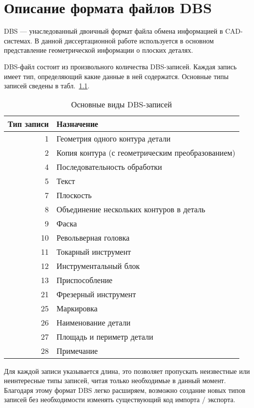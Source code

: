 
\chapter{%
  Описание формата файлов DBS
}
\label{app:dbs}

DBS ---
унаследованный двоичный формат файла
обмена информацией в CAD-системах.
В данной диссертационной работе
используется в основном представление
геометрической информации о плоских деталях.

DBS-файл состоит из произвольного количества DBS-записей.
Каждая запись имеет тип, определяющий какие данные в ней содержатся.
Основные типы записей сведены в табл.~\ref{tab:dbs.records}.

\begin{table}[h]
  \caption{Основные виды DBS-записей}
  \label{tab:dbs.records}
  \centering
  \begin{tabular}{|r|l|}
    \hline
    Тип записи & Назначение \\
    \hline
    1  & Геометрия одного контура детали  \\
    2  & Копия контура (с геометрическим преобразованием) \\
    4  & Последовательность обработки \\
    5  & Текст  \\
    7  & Плоскость  \\
    8  & Объединение нескольких контуров в деталь \\
    9  & Фаска  \\
    10 & Револьверная головка \\
    11 & Токарный инструмент  \\
    12 & Инструментальный блок  \\
    13 & Приспособление \\
    21 & Фрезерный инструмент \\
    25 & Маркировка \\
    26 & Наименование детали  \\
    27 & Площадь и периметр детали  \\
    28 & Примечание \\
    \hline
  \end{tabular}
\end{table}

Для каждой записи указывается длина,
это позволяет пропускать неизвестные или
неинтересные типы записей,
читая только необходимые в данный момент.
Благодаря этому формат DBS
легко расширяем,
возможно создание новых типов записей
без необходимости изменять существующий
код импорта / экспорта.

